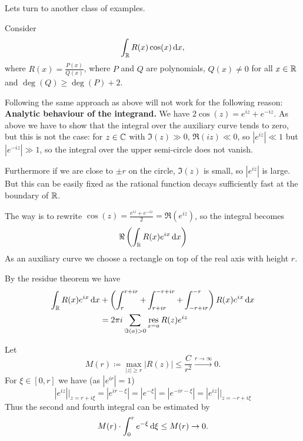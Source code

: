 \documentclass[a4paper,english]{article}
\begin{document}
Lets turn to another class of examples.
\begin{exampleB}[TODO]
    Consider
    \begin{equation*}
        \int_{\operatorname{\mathbb{R}}} R(x) \cos(x) \mathop{}\!\mathrm{d}{x},
    \end{equation*}
    where $R(x) = \frac{P(x)}{Q(x)}$, where $P$ and $Q$ are polynomials, $Q(x) \ne 0$ for all $x \in \operatorname{\mathbb{R}}$ and $\deg(Q) \ge \deg(P) + 2$. 
    
    Following the same approach as above will not work for the following reason:
        \textbf{Analytic behaviour of the integrand.}
        We have $2 \cos(z) = e^{i z} + e^{- i z}$.
        As above we have to show that the integral over the auxiliary curve tends to zero, but this is not the case: for $z \in \operatorname{\mathbb{C}}$ with $\Im(z) \gg 0$, $\Re(i z) \ll 0$, so $| e^{i z} | \ll 1$ but $| e^{- i z} | \gg 1$, so the integral over the upper semi-circle does not vanish.
        
        Furthermore if we are close to $\pm r$ on the circle, $\Im(z)$ is small, so $| e^{i z} |$ is large.
        But this can be easily fixed as the rational function decays sufficiently fast at the boundary of $\operatorname{\mathbb{R}}$.
    
    The way is to rewrite $\cos(z) = \frac{e^{i z} + e^{- i z}}{2} = \Re(e^{i z})$, so the integral becomes
    \begin{equation}
        \Re\left(\int_{\operatorname{\mathbb{R}}} R(x) e^{i x} \mathop{}\!\mathrm{d}{x}\right) 
    \end{equation}
    As an auxiliary curve we choose a rectangle on top of the real axis with height $r$.
    
    By the residue theorem we have
    \begin{align*}
        \int_{\operatorname{\mathbb{R}}} R(x) e^{i x} \mathop{}\!\mathrm{d}{x}
        & + \left( \int_{r}^{r + i r} + \int_{r + i r}^{- r + i r} + \int_{-r + i r}^{-r}\right) R(x) e^{i x} \mathop{}\!\mathrm{d}{x} \\
        & = 2 \pi i \sum_{\Im(a) > 0} \operatorname*{res}_{z = a} R(z) e^{i z}
    \end{align*}
    
    Let
    \begin{equation*}
        M(r)
        \coloneqq \max_{| z | \ge r} | R(z) |
        \le \frac{C}{r^2}
        \xrightarrow{r \to \infty} 0.
    \end{equation*}
    For $\xi \in [0, r]$ we have (as $| e^{i r} | = 1$)
    \begin{equation*}
        | e^{i z} | \big|_{z = r + i \xi}
        = | e^{i r - \xi} |
        = | e^{- \xi} |
        = | e^{- i r - \xi} |
        = | e^{i z} | \big|_{z = - r + i \xi}
    \end{equation*}
    Thus the second and fourth integral can be estimated by
    \begin{equation*}
        M(r) \cdot \int_{0}^{r} e^{- \xi} \mathop{}\!\mathrm{d}{\xi}
        \le M(r)
        \to 0.
    \end{equation*}
    

\end{exampleB}
\end{document}
